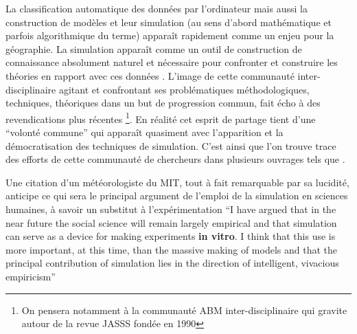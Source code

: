 
La classification automatique des données par l'ordinateur mais aussi la construction de modèles et leur simulation (au sens d'abord mathématique et parfois algorithmique du terme) apparaît rapidement comme un enjeu pour la géographie. La simulation apparaît comme un outil de construction de connaissance absolument naturel et nécessaire pour confronter et construire les théories en rapport avec ces données \autocite{Kao1963, Hagerstrand1967b}. L'image de cette communauté inter-disciplinaire agitant et confrontant ses problématiques méthodologiques, techniques, théoriques dans un but de progression commun, fait écho à des revendications plus récentes \footnote{On pensera notamment à la communauté ABM inter-disciplinaire qui gravite autour de la revue JASSS fondée en  1990}. En réalité cet esprit de partage tient d'une \enquote{volonté commune} qui apparaît quasiment avec l'apparition et la démocratisation des techniques de simulation. C'est ainsi que l'on trouve trace des efforts de cette communauté de chercheurs dans plusieurs ouvrages tels que \autocite{Beshers1965,Naylor1966,Dutton1971,Guetzkow1962,Guetzkow1972}.

Une citation d'un météorologiste du MIT, tout à fait remarquable par sa lucidité, anticipe ce qui sera le principal argument de l'emploi de la simulation en sciences humaines, à savoir un substitut à l'expérimentation \foreignquote{english}{I have argued that in the near future the social science will remain largely empirical and that simulation can serve as a device for making experiments \textbf{in vitro}. I think that this use is more important, at this time, than the massive making of models and that the principal contribution of simulation lies in the direction of intelligent, vivacious empiricism} \autocite{Fleisher1965}


